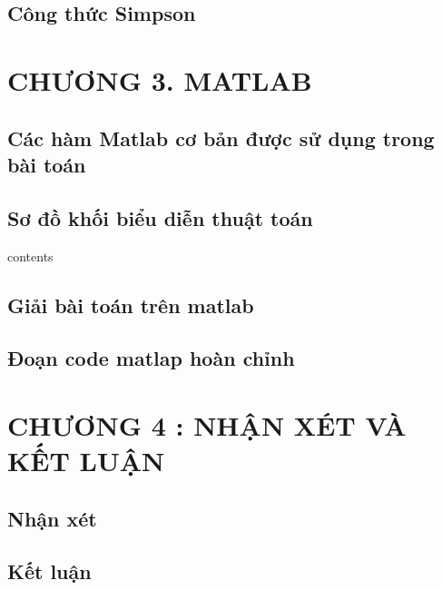 \documentclass[14pt,a4paper]{article}
\begin{document}
\subsection{ Công thức Simpson}
\newpage
\section*{CHƯƠNG 3. MATLAB}
\subsection{ Các hàm Matlab cơ bản được sử dụng trong bài toán}
\subsection{Sơ đồ khối biểu diễn thuật toán}
contents
\subsection{Giải bài toán trên matlab}
\subsection{Đoạn code matlap hoàn chỉnh}
\newpage
\section*{CHƯƠNG 4 : NHẬN XÉT VÀ KẾT LUẬN}
\subsection{  Nhận xét}
\subsection{Kết luận}
\newpage
\end{document}
